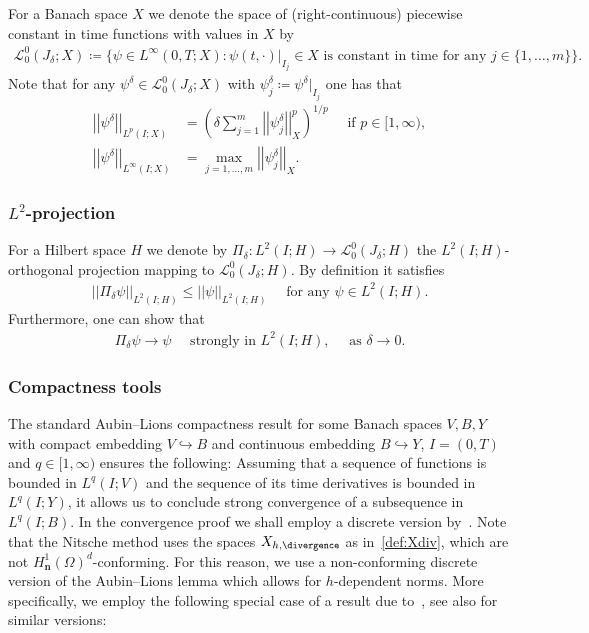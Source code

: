 \documentclass[reqno,a4paper]{amsart}
\def\norm#1{\left|\!\left| #1 \right|\!\right|}
\def\vec#1{\boldsymbol{#1}}
\def\bn{\vec{n}}
\def\Pid{{\Pi_\delta}}
\begin{document}
For a Banach space $X$ we denote the space of (right-continuous) piecewise constant in time functions with values in $X$ by 
\begin{align*}
	\mathcal{L}_{0}^0(J_\delta; X)\coloneqq \{\psi \in L^{\infty}(0,T;X)\colon \psi(t,\cdot)|_{I_j} \in X \text{ is constant in time for any } j \in \{1,\ldots, m \}\}. 
\end{align*}
Note that for any $\psi^\delta \in \mathcal{L}_{0}^0(J_\delta; X)$ with $\psi^\delta_j \coloneqq \psi^\delta|_{I_{j}}$ one has that 
\begin{align*}
	\norm{\psi^\delta}_{L^p(I;X)} 
	&= \left( \delta \sum_{j= 1}^m  \norm{\psi^\delta_j}_X^p \right)^{1/p} 
	\quad \text{ if } p \in [1,\infty),
	\\
	\norm{\psi^\delta}_{L^\infty(I;X)} 
	&= \max_{j= 1, \ldots, m} 
	\norm{\psi^\delta_j}_X.
\end{align*}

\subsubsection{$L^2$-projection}\label{def:Pid}

For a Hilbert space $H$ we denote by $\Pi_\delta \colon L^2(I;H) \to \mathcal{L}_{0}^0(J_\delta; H)$ the $L^2(I;H)$-orthogonal projection mapping to $\mathcal{L}_{0}^0(J_\delta; H)$. 
By definition it satisfies 
\begin{align}\label{est:Pd-stab-L2}
	\norm{\Pid \psi}_{L^2(I;H)} \leq \norm{\psi}_{L^2(I;H)} \quad \text{ for any } \psi \in L^2(I;H). 
\end{align}
Furthermore, one can show that 
\begin{align}\label{est:Pid-conv}
	\Pid \psi \to \psi \quad \text{ strongly in } L^2(I;H), \quad \text{ as } \delta \to 0. 
\end{align}

\subsubsection{Compactness tools}

The standard Aubin--Lions compactness result for some Banach spaces $V,B,Y$ with compact embedding $V \hookrightarrow B$ and  continuous embedding $B \hookrightarrow Y$, $I = (0,T)$ and $q \in [1,\infty)$ ensures the following: 
Assuming that a sequence of functions is bounded in $L^q(I;V)$ and the sequence of its time derivatives is bounded in $L^{q}(I;Y)$, it allows us to conclude strong convergence of a subsequence in $L^{q}(I;B)$. 
In the convergence proof we shall employ a  discrete version by~\cite{GallouetLatche2012}. 
{Note that the Nitsche method uses the spaces $X_{h,\divergence}$ as in~\eqref{def:Xdiv}, which are not $H^1_{\bn}(\Omega)^d$-conforming.
	For this reason, we use a non-conforming discrete version of the Aubin--Lions lemma which allows for $h$-dependent norms. 
	More specifically, we employ the following special case of a  result}  due to~\cite{GallouetLatche2012}, see also \cite{DreherJuengel2012,CJL.2014} for similar versions:  
\end{document}

